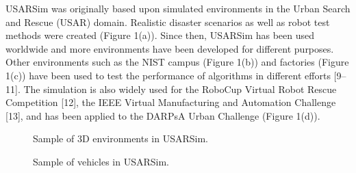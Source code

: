 USARSim was originally based upon simulated environments in the Urban Search and Rescue (USAR) domain. Realistic disaster scenarios as well
as robot test methods were created (Figure 1(a)). Since then, USARSim has been used worldwide and more environments have been developed for different purposes. Other environments such as the NIST campus (Figure 1(b)) and factories (Figure 1(c)) have been used to test the performance of algorithms in different efforts [9–11]. The simulation is also widely used for the RoboCup Virtual Robot Rescue Competition [12], the IEEE Virtual Manufacturing and Automation Challenge [13], and has been applied to the DARPsA Urban Challenge (Figure 1(d)).


\begin{figure}[t!]
\centering
{}\qquad
{}
\caption{Sample of 3D environments in USARSim.} \label{3D_World}
\end{figure}
\begin{figure}[t!]
\centering
{}\qquad
{}
\caption{Sample of vehicles in USARSim.}
\end{figure}
